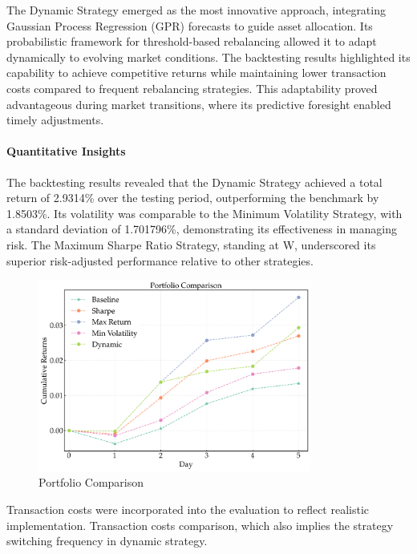 The Dynamic Strategy emerged as the most innovative approach, integrating Gaussian Process Regression (GPR) forecasts to guide asset allocation. Its probabilistic framework for threshold-based rebalancing allowed it to adapt dynamically to evolving market conditions. The backtesting results highlighted its capability to achieve competitive returns while maintaining lower transaction costs compared to frequent rebalancing strategies. This adaptability proved advantageous during market transitions, where its predictive foresight enabled timely adjustments.
\paragraph{Quantitative Insights}
The backtesting results revealed that the Dynamic Strategy achieved a total return of 2.9314\% over the testing period, outperforming the benchmark by 1.8503\%. Its volatility was comparable to the Minimum Volatility Strategy, with a standard deviation of 1.701796\%, demonstrating its effectiveness in managing risk. The Maximum Sharpe Ratio Strategy, standing at W, underscored its superior risk-adjusted performance relative to other strategies.
\begin{figure}[htbp]
    \centering
    \includegraphics[width=0.8\textwidth]{figures/portfolio_comparison_final_non.png}
    \caption{Portfolio Comparison}
    \label{fig:portfolio_comparison_non_iterative}
\end{figure}

Transaction costs were incorporated into the evaluation to reflect realistic implementation. 
Transaction costs comparison, which also implies the strategy switching frequency in dynamic strategy.


